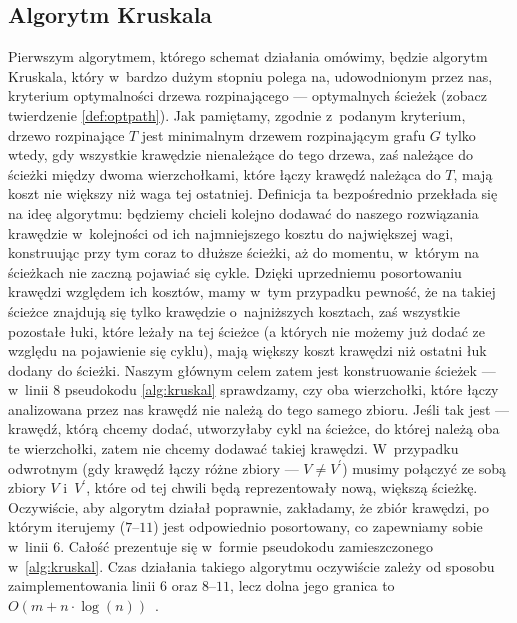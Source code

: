 \subsection{Algorytm Kruskala}



Pierwszym algorytmem, którego schemat działania omówimy, będzie algorytm Kruskala, który w~bardzo dużym stopniu polega na, udowodnionym przez nas, kryterium optymalności drzewa rozpinającego --- optymalnych ścieżek (zobacz twierdzenie \ref{def:optpath}).
Jak pamiętamy, zgodnie z~podanym kryterium, drzewo rozpinające $T$ jest minimalnym drzewem rozpinającym grafu $G$ tylko wtedy, gdy wszystkie krawędzie nienależące do tego drzewa, zaś należące do ścieżki między dwoma wierzchołkami, które łączy krawędź należąca do $T$, mają koszt nie większy niż waga tej ostatniej.
Definicja ta bezpośrednio przekłada się na ideę algorytmu: będziemy chcieli kolejno dodawać do naszego rozwiązania krawędzie w~kolejności od ich najmniejszego kosztu do największej wagi, konstruując przy tym coraz to dłuższe ścieżki, aż do momentu, w~którym na ścieżkach nie zaczną pojawiać się cykle.
Dzięki uprzedniemu posortowaniu krawędzi względem ich kosztów, mamy w~tym przypadku pewność, że na takiej ścieżce znajdują się tylko krawędzie o~najniższych kosztach, zaś wszystkie pozostałe łuki, które leżały na tej ścieżce (a których nie możemy już dodać ze względu na pojawienie się cyklu), mają większy koszt krawędzi niż ostatni łuk dodany do ścieżki.
Naszym głównym celem zatem jest konstruowanie ścieżek --- w~linii $8$ pseudokodu \ref{alg:kruskal} sprawdzamy, czy oba wierzchołki, które łączy analizowana przez nas krawędź nie należą do tego samego zbioru.
Jeśli tak jest --- krawędź, którą chcemy dodać, utworzyłaby cykl na ścieżce, do której należą oba te wierzchołki, zatem nie chcemy dodawać takiej krawędzi.
W~przypadku odwrotnym (gdy krawędź łączy różne zbiory --- $V \neq V^{\prime}$) musimy połączyć ze sobą zbiory $V$ i~$V^{\prime}$, które od tej chwili będą reprezentowały nową, większą ścieżkę.
Oczywiście, aby algorytm działał poprawnie, zakładamy, że zbiór krawędzi, po którym iterujemy ($7$--$11$) jest odpowiednio posortowany, co zapewniamy sobie w~linii $6$.
Całość prezentuje się w~formie pseudokodu zamieszczonego w~\ref{alg:kruskal}.
Czas działania takiego algorytmu oczywiście zależy od sposobu zaimplementowania linii $6$ oraz $8$--$11$, lecz dolna jego granica to $O \left( m + n \cdot \log \left( n \right) \right)$~\cite[$522$]{Ahuja:1993:NFT:137406}.

